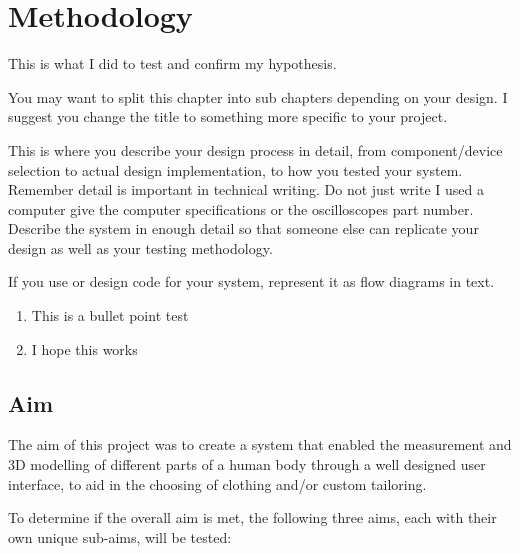 \chapter{Methodology} \label{methodology}

This is what I did to test and confirm my hypothesis.


You may want to split this chapter into sub chapters depending on your design. I suggest you change
the title to something more specific to your project.

This is where you describe your design process in detail, from component/device selection to actual
design implementation, to how you tested your system. Remember detail is important in technical
writing. Do not just write I used a computer give the computer specifications or the oscilloscopes part
number. Describe the system in enough detail so that someone else can replicate your design as well
as your testing methodology.

If you use or design code for your system, represent it as flow diagrams in text.

\begin{enumerate}
\item This is a bullet point test
\item I hope this works
	
\end{enumerate}	

\section{Aim} \label{methodologyAim}
The aim of this project was to create a system that enabled the measurement and 3D modelling of different parts of a human body through a well designed user interface, to aid in the choosing of clothing and/or custom tailoring.

To determine if the overall aim is met, the following three aims, each with their own unique sub-aims, will be tested:

